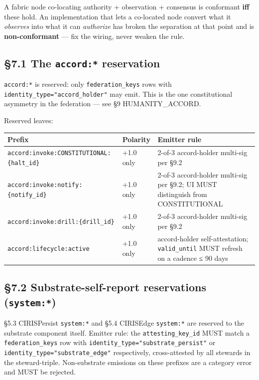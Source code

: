 \documentclass[10pt]{article}
\begin{document}
A fabric node co-locating authority + observation + consensus is conformant \textbf{iff} these hold. An implementation that lets a co-located node convert what it \textit{observes} into what it can \textit{authorize} has broken the separation at that point and is \textbf{non-conformant} — fix the wiring, never weaken the rule.


\subsection*{§7.1 The \texttt{accord:*} reservation}


\texttt{accord:*} is reserved: only \texttt{federation\_keys} rows with \texttt{identity\_type="accord\_holder"} may emit. This is the one constitutional asymmetry in the federation — see §9 HUMANITY\_ACCORD.


Reserved leaves:


{\footnotesize
\begin{longtable}{|p{5.33cm}|p{5.33cm}|p{5.33cm}|}\hline
\textbf{Prefix} & \textbf{Polarity} & \textbf{Emitter rule} \\ \hline\endhead
\texttt{accord:invoke:CONSTITUTIONAL:\{halt\_id\}} & +1.0 only & 2-of-3 accord-holder multi-sig per §9.2 \\ \hline
\texttt{accord:invoke:notify:\{notify\_id\}} & +1.0 only & 2-of-3 accord-holder multi-sig per §9.2; UI MUST distinguish from CONSTITUTIONAL \\ \hline
\texttt{accord:invoke:drill:\{drill\_id\}} & +1.0 only & 2-of-3 accord-holder multi-sig per §9.2 \\ \hline
\texttt{accord:lifecycle:active} & +1.0 only & accord-holder self-attestation; \texttt{valid\_until} MUST refresh on a cadence ≤ 90 days \\ \hline
\end{longtable}}


\subsection*{§7.2 Substrate-self-report reservations (\texttt{system:*})}


§5.3 CIRISPersist \texttt{system:*} and §5.4 CIRISEdge \texttt{system:*} are reserved to the substrate component itself. Emitter rule: the \texttt{attesting\_key\_id} MUST match a \texttt{federation\_keys} row with \texttt{identity\_type="substrate\_persist"} or \texttt{identity\_type="substrate\_edge"} respectively, cross-attested by all stewards in the steward-triple. Non-substrate emissions on these prefixes are a category error and MUST be rejected.
\end{document}
